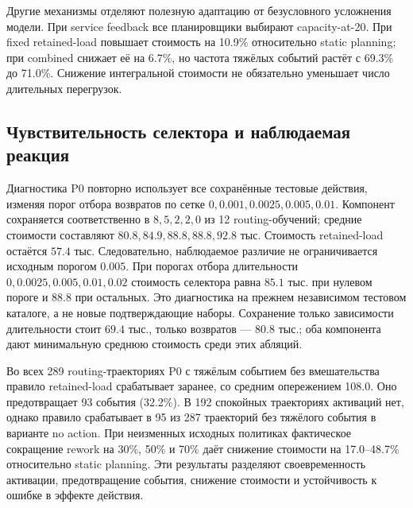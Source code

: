 Другие механизмы отделяют полезную адаптацию от безусловного усложнения модели. При service feedback все планировщики выбирают capacity-at-20. При fixed retained-load повышает стоимость на 10.9\% относительно static planning; при combined снижает её на 6.7\%, но частота тяжёлых событий растёт с 69.3\% до 71.0\%. Снижение интегральной стоимости не обязательно уменьшает число длительных перегрузок.

\subsection{Чувствительность селектора и наблюдаемая реакция}
Диагностика P0 повторно использует все сохранённые тестовые действия, изменяя порог отбора возвратов по сетке $0,0.001,0.0025,0.005,0.01$. Компонент сохраняется соответственно в $8,5,2,2,0$ из 12 routing-обучений; средние стоимости составляют $80.8,84.9,88.8,88.8,92.8$ тыс. Стоимость retained-load остаётся $57.4$ тыс. Следовательно, наблюдаемое различие не ограничивается исходным порогом $0.005$. При порогах отбора длительности $0,0.0025,0.005,0.01,0.02$ стоимость селектора равна $85.1$ тыс. при нулевом пороге и $88.8$ при остальных. Это диагностика на прежнем независимом тестовом каталоге, а не новые подтверждающие наборы. Сохранение только зависимости длительности стоит $69.4$ тыс., только возвратов — $80.8$ тыс.; оба компонента дают минимальную среднюю стоимость среди этих абляций.

Во всех 289 routing-траекториях P0 с тяжёлым событием без вмешательства правило retained-load срабатывает заранее, со средним опережением 108.0. Оно предотвращает 93 события (32.2\%). В 192 спокойных траекториях активаций нет, однако правило срабатывает в 95 из 287 траекторий без тяжёлого события в варианте no action. При неизменных исходных политиках фактическое сокращение rework на 30\%, 50\% и 70\% даёт снижение стоимости на 17.0--48.7\% относительно static planning. Эти результаты разделяют своевременность активации, предотвращение события, снижение стоимости и устойчивость к ошибке в эффекте действия.


